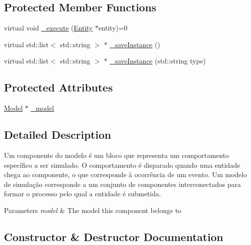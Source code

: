 \subsection*{Protected Member Functions}
\begin{DoxyCompactItemize}
\item 
virtual void \hyperlink{class_model_component_ae3fcf8bbdd8368c882438424aa73f714}{\+\_\+execute} (\hyperlink{class_entity}{Entity} $\ast$entity)=0
\item 
virtual std\+::list$<$ std\+::string $>$ $\ast$ \hyperlink{class_model_component_a465f41c7191cb0fdf9039ef1f3d755a5}{\+\_\+save\+Instance} ()
\item 
virtual std\+::list$<$ std\+::string $>$ $\ast$ \hyperlink{class_model_component_a245ef30906086f28651a559cdc9a8120}{\+\_\+save\+Instance} (std\+::string type)
\end{DoxyCompactItemize}
\subsection*{Protected Attributes}
\begin{DoxyCompactItemize}
\item 
\hyperlink{class_model}{Model} $\ast$ \hyperlink{class_model_component_a9d9e835755618a794c9759882641bc3c}{\+\_\+model}
\end{DoxyCompactItemize}


\subsection{Detailed Description}
Um componente do modelo é um bloco que representa um comportamento específico a ser simulado. O comportamento é disparado quando uma entidade chega ao componente, o que corresponde à ocorrência de um evento. Um modelo de simulação corresponde a um conjunto de componentes interconectados para formar o processo pelo qual a entidade é submetida. 
\begin{DoxyParams}{Parameters}
{\em model} & The model this component belongs to \\
\hline
\end{DoxyParams}


\subsection{Constructor \& Destructor Documentation}
